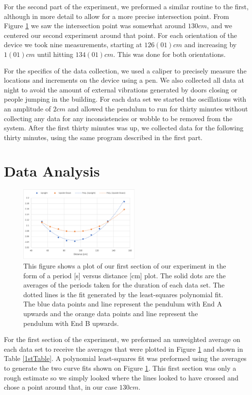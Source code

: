\documentclass[aps,prl,10pt,twocolumn,floatfix]{revtex4-2}
\begin{document}
For the second part of the experiment, we preformed a similar routine to the first, although in more detail to allow for a more precise intersection point. 
From Figure \ref{1stGraph} we saw the intersection point was somewhat around $130cm$, and we centered our second experiment around that point. 
For each orientation of the device we took nine measurements, starting at $126(01)cm$ and increasing by $1(01)cm$ until hitting $134(01)cm$. 
This was done for both orientations. 

For the specifics of the data collection, we used a caliper to precisely measure the locations and increments on the device using a pen.
We also collected all data at night to avoid the amount of external vibrations generated by doors closing or people jumping in the building. 
For each data set we started the oscillations with an amplitude of $2cm$ and allowed the pendulum to run for thirty minutes without collecting any data for any inconsistencies or wobble to be removed from the system. 
After the first thirty minutes was up, we collected data for the following thirty minutes, using the same program described in the first part. 


\section{Data Analysis}
\begin{figure}
\includegraphics[width=230px]{FirstMeasurement.png}
\caption{This figure shows a plot of our first section of our experiment in the form of a period [s] versus distance [cm] plot. The solid dots are the averages of the periods taken for the duration of each data set. The dotted lines is the fit generated by the least-squares polynomial fit. The blue data points and line represent the pendulum with End A upwards and the orange data points and line represent the pendulum with End B upwards.}
\label{1stGraph}
\end{figure}

For the first section of the experiment, we preformed an unweighted average on each data set to receive the averages that were plotted in Figure \ref{1stGraph} and shown in Table \ref{1stTable}.
A polynomial least-squares fit was preformed using the averages to generate the two curve fits shown on Figure \ref{1stGraph}. 
This first section was only a rough estimate so we simply looked where the lines looked to have crossed and chose a point around that, in our case $130cm$. 
\end{document}
